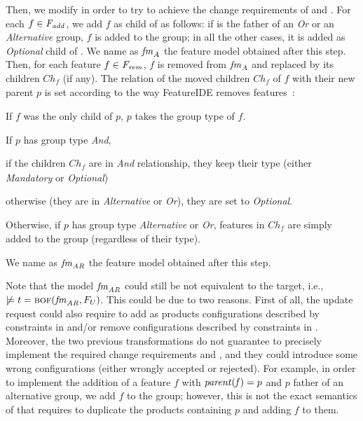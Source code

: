 \begin{tikzborder}{\cite{Gargantini16:validation}}
\begin{tikzborder}{\cite{gargantini_combinatorial_2017}}
\begin{tikzborder}{\cite{gargantini_combinatorial_2017}}
\begin{tikzborder}{\cite{garn2019}}
\begin{tikzborder}{\cite{arcaini2019achieving}}
	Then, we modify \fmrenamed in order to try to achieve the change requirements of \Fadd and \Frem. For each $f \in \mathit{F_{add}}$, we add $f$ as child of  as follows: if  is the father of an {\it Or} or an {\it Alternative} group, $f$ is added to the group; in all the other cases, it is added as {\it Optional} child of . We name as $\mathit{fm}_{A}$ the feature model obtained after this step. Then, for each feature $f \in \mathit{F_{rem}}$, $f$ is removed from $\mathit{fm}_{A}$ and replaced by its children $\mathit{Ch_f}$ (if any). The relation of the moved children $\mathit{Ch_f}$ of $f$ with their new parent $p$ is set according to the way FeatureIDE removes features~\cite{FeatureIDEbook}:
	\begin{compactenum}
		\item If $f$ was the only child of $p$, $p$ takes the group type of $f$. 
		\item If $p$ has group type {\it And}, 
		\begin{inparaenum}
			\item if the children $\mathit{Ch_f}$ are in {\it And} relationship, they keep their type (either {\it Mandatory} or {\it Optional})
			\item otherwise (they are in {\it Alternative} or {\it Or}), they are set to {\it Optional}.
		\end{inparaenum}
		\item Otherwise, if $p$ has group type {\it Alternative} or {\it Or}, features in $\mathit{Ch_f}$ are simply added to the group (regardless of their type).
	\end{compactenum}
	
	
	We name as $\mathit{fm}_{\mathit{AR}}$ the feature model obtained after this step.
	
	Note that the model $\mathit{fm}_{\mathit{AR}}$ could still be not equivalent to the target, i.e., $\not \models t = \textsc{bof}(\mathit{fm}_{\mathit{AR}}, F_U)$. This could be due to two reasons. First of all, the update request could also require to add as products configurations described by constraints in \CFrelax and/or remove configurations described by constraints in \CFrem. Moreover, the two previous transformations do not guarantee to precisely implement the required change requirements \Fadd and \Frem, and they could introduce some wrong configurations (either wrongly accepted or rejected). For example, in order to implement the addition of a feature $f$ with $\mathit{parent(f)} = p$ and $p$ father of an alternative group, we add $f$ to the group; however, this is not the exact semantics of \Fadd that requires to duplicate the products containing $p$ and adding $f$ to them.
	\be
	

\end{tikzborder}
\end{tikzborder}
\end{tikzborder}
\end{tikzborder}
\end{tikzborder}
